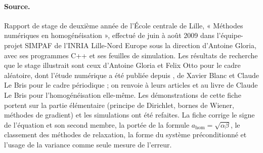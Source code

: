 \documentclass[11pt,a4paper]{article}
\theoremstyle{plain}
\theoremstyle{definition}
\theoremstyle{remark}
\begin{document}
\paragraph{Source.} Rapport de stage de deuxième année de l'École centrale de Lille, « Méthodes numériques en homogénéisation », effectué de juin à août 2009 dans l'équipe-projet SIMPAF de l'INRIA Lille-Nord Europe sous la direction d'Antoine Gloria, avec ses programmes C++ et ses feuilles de simulation. Les résultats de recherche que le stage illustrait sont ceux d'Antoine Gloria et Felix Otto \cite{go1,go2} pour le cadre aléatoire, dont l'étude numérique a été publiée depuis \cite{egmn}, de Xavier Blanc et Claude Le Bris \cite{blb} pour le cadre périodique ; on renvoie à leurs articles et au livre de Claude Le Bris \cite{lebris} pour l'homogénéisation elle-même. Les démonstrations de cette fiche portent sur la partie élémentaire (principe de Dirichlet, bornes de Wiener, méthodes de gradient) et les simulations ont été refaites. La fiche corrige le signe de l'équation et son second membre, la portée de la formule $a_{\mathrm{hom}}=\sqrt{\alpha\beta}$, le classement des méthodes de relaxation, la forme du système préconditionné et l'usage de la variance comme seule mesure de l'erreur.
\end{document}
